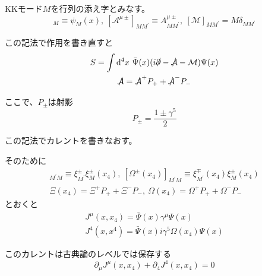 \documentclass[
  unicode,a4paper,9pt,
  xcolor = {dvipsnames,svgnames},
  hyperref ={colorlinks=true,citecolor=Navy,linkcolor=NavyBlue,urlcolor=purple},
  ja=standard,lualatex
]{beamer}
\begin{document}
\begin{frame}

  KKモード$M$を行列の添え字とみなす。
  \begin{equation*}
    [\Psi(x)]_{M}
    \equiv
    \psi_{M}(x)
    ,\ 
    [\mathcal{A}^{\mu\pm}]_{MM^{\prime}}
    \equiv
    A^{\mu\pm}_{MM^{\prime}}
    ,\ 
    [\mathcal{M}]_{MM^{\prime}}
    =
    M\delta_{MM^{\prime}}
  \end{equation*}

  この記法で作用を書き直すと
  \begin{gather*}
    S
    =
    \int\dd^4 x\ 
    \bar{\Psi}(x)(i\slashed{\partial}-\slashed{\mathcal{A}}-\mathcal{M})\Psi(x)
    \\
    \slashed{\mathcal{A}}
    =
    \slashed{\mathcal{A}}^{+}P_{+}
    +
    \slashed{\mathcal{A}}^{-}P_{-}    
  \end{gather*}
  
  ここで、$P_{\pm}$は射影
  \begin{equation*}
    P_{\pm}
    =
    \frac{1\pm\gamma^{5}}{2}
  \end{equation*}

\end{frame}


\begin{frame}

  この記法でカレントを書きなおす。

  そのために
  \begin{gather*}
    [\Xi^{\pm}(x_4)]_{M^{\prime}M}
    \equiv
    \xi^{\pm}_{M^{\prime}}\xi^{\pm}_{M}(x_{4})
    ,\ 
    [\Omega^{\pm}(x_{4})]_{M^{\prime}M}
    \equiv
    \xi_{M^{\prime}}^{\mp}(x_{4})\xi_{M}^{\pm}(x_{4})
    \\
    \Xi(x_{4})
    =
    \Xi^{+}P_{+}
    +
    \Xi^{-}P_{-}
    ,\ 
    \Omega(x_{4})
    =
    \Omega^{+}P_{+}
    +
    \Omega^{-}P_{-}
  \end{gather*}
  とおくと
  \begin{gather*}
    J^{\mu}(x,x_{4})
    =
    \bar{\Psi}(x)\gamma^{\mu}\Psi(x)
    \\
    J^{4}(x,x^{4})
    =
    \bar{\Psi}(x)i\gamma^{5}\Omega(x_{4})\Psi(x)
  \end{gather*}

  このカレントは古典論のレベルでは保存する
  \begin{equation*}
    \partial_{\mu}J^{\mu}(x,x_{4})
    +
    \partial_{4}J^{4}(x,x_{4})
    =
    0
  \end{equation*}

\end{frame}
\end{document}
